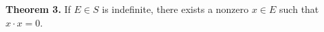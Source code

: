 \textbf{Theorem 3.} If $E \in S$ is indefinite, there exists a nonzero $x \in E$ such that $x \cdot x = 0$.
